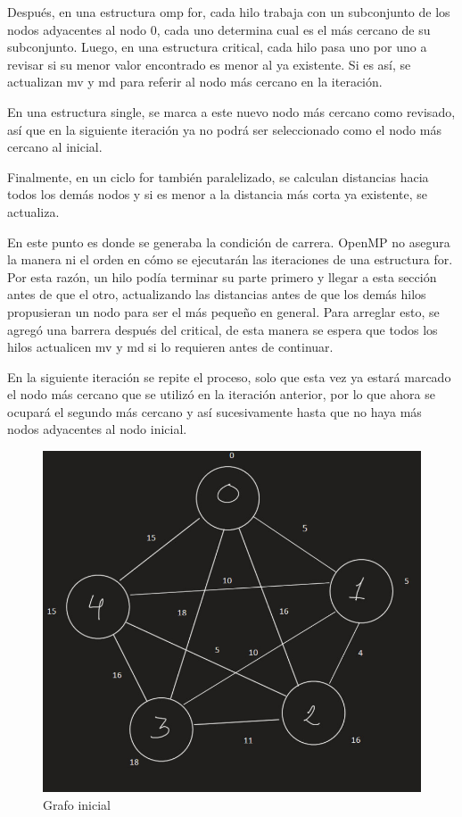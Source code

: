 \documentclass[11pt]{article}
\begin{document}
\par
Después, en una estructura omp for, cada hilo trabaja con un subconjunto de los nodos adyacentes al nodo 0, cada uno determina cual es el más cercano de su subconjunto. Luego, en una estructura critical, cada hilo pasa uno por uno a revisar si su menor valor encontrado es menor al ya existente. Si es así, se actualizan mv y md para referir al nodo más cercano en la iteración.
\par
En una estructura single, se marca a este nuevo nodo más cercano como revisado, así que en la siguiente iteración ya no podrá ser seleccionado como el nodo más cercano al inicial.
\par
Finalmente, en un ciclo for también paralelizado, se calculan distancias hacia todos los demás nodos y si es menor a la distancia más corta ya existente, se actualiza. 
\par
En este punto es donde se generaba la condición de carrera. OpenMP no asegura la manera ni el orden en cómo se ejecutarán las iteraciones de una estructura for. Por esta razón, un hilo podía terminar su parte primero y llegar a esta sección antes de que el otro, actualizando las distancias antes de que los demás hilos propusieran un nodo para ser el más pequeño en general. Para arreglar esto, se agregó una barrera después del critical, de esta manera se espera que todos los hilos actualicen mv y md si lo requieren antes de continuar. 
\par
En la siguiente iteración se repite el proceso, solo que esta vez ya estará marcado el nodo más cercano que se utilizó en la iteración anterior, por lo que ahora se ocupará el segundo más cercano y así sucesivamente hasta que no haya más nodos adyacentes al nodo inicial.


\begin{figure}[!htbp]
\centering
\includegraphics[scale = .5]{grafos1}
\caption{Grafo inicial}
\end{figure}
\end{document}
